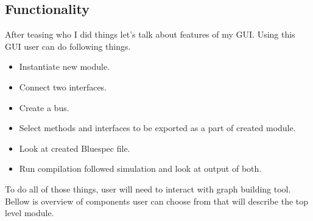 \documentclass[12pt]{report}
\begin{document}
\subsection{Functionality}
After teasing who I did things let's talk about features of my GUI. 
Using this GUI user can do following things. 
\begin{itemize}
    \item Instantiate new module. 
    \item Connect two interfaces.
    \item Create a bus.
    \item Select methods and interfaces to be exported as a part of created module.
    \item Look at created Bluespec file.
    \item Run compilation followed simulation and look at output of both. 
\end{itemize}
To do all of those things, user will need to interact with graph building tool. Bellow is overview of components user can choose from that will describe the top level module.
\end{document}
